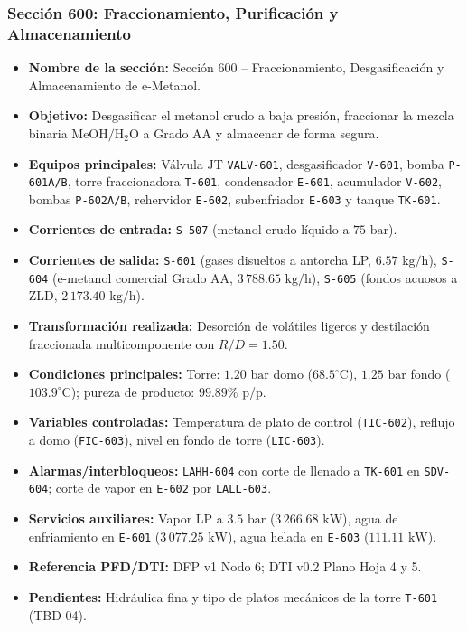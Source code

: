 \documentclass[10pt,letterpaper]{article}
\begin{document}
\subsubsection{Sección 600: Fraccionamiento, Purificación y Almacenamiento}
\begin{itemize}
    \item \textbf{Nombre de la sección:} Sección 600 -- Fraccionamiento, Desgasificación y Almacenamiento de e-Metanol.
    \item \textbf{Objetivo:} Desgasificar el metanol crudo a baja presión, fraccionar la mezcla binaria $\text{MeOH}/\text{H}_2\text{O}$ a Grado AA y almacenar de forma segura.
    \item \textbf{Equipos principales:} Válvula JT \texttt{VALV-601}, desgasificador \texttt{V-601}, bomba \texttt{P-601A/B}, torre fraccionadora \texttt{T-601}, condensador \texttt{E-601}, acumulador \texttt{V-602}, bombas \texttt{P-602A/B}, rehervidor \texttt{E-602}, subenfriador \texttt{E-603} y tanque \texttt{TK-601}.
    \item \textbf{Corrientes de entrada:} \texttt{S-507} (metanol crudo líquido a $75\text{ bar}$).
    \item \textbf{Corrientes de salida:} \texttt{S-601} (gases disueltos a antorcha LP, $6.57\text{ kg/h}$), \texttt{S-604} (e-metanol comercial Grado AA, $3\,788.65\text{ kg/h}$), \texttt{S-605} (fondos acuosos a ZLD, $2\,173.40\text{ kg/h}$).
    \item \textbf{Transformación realizada:} Desorción de volátiles ligeros y destilación fraccionada multicomponente con $R/D = 1.50$.
    \item \textbf{Condiciones principales:} Torre: $1.20\text{ bar}$ domo ($68.5^\circ\text{C}$), $1.25\text{ bar}$ fondo ($103.9^\circ\text{C}$); pureza de producto: $99.89\%$ p/p.
    \item \textbf{Variables controladas:} Temperatura de plato de control (\texttt{TIC-602}), reflujo a domo (\texttt{FIC-603}), nivel en fondo de torre (\texttt{LIC-603}).
    \item \textbf{Alarmas/interbloqueos:} \texttt{LAHH-604} con corte de llenado a \texttt{TK-601} en \texttt{SDV-604}; corte de vapor en \texttt{E-602} por \texttt{LALL-603}.
    \item \textbf{Servicios auxiliares:} Vapor LP a $3.5\text{ bar}$ ($3\,266.68\text{ kW}$), agua de enfriamiento en \texttt{E-601} ($3\,077.25\text{ kW}$), agua helada en \texttt{E-603} ($111.11\text{ kW}$).
    \item \textbf{Referencia PFD/DTI:} DFP v1 Nodo 6; DTI v0.2 Plano Hoja 4 y 5.
    \item \textbf{Pendientes:} Hidráulica fina y tipo de platos mecánicos de la torre \texttt{T-601} (TBD-04).
\end{itemize}
\end{document}
